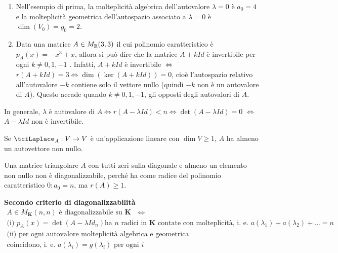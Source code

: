 \documentclass{article}
\begin{document}
\begin{enumerate}
\item Nell'esempio di prima, la molteplicit\`{a} algebrica dell'autovalore $%
\lambda =0$ \`{e} $a_{0}=4$ e la molteplicit\`{a} geometrica dell'autospazio
associato a $\lambda =0$ \`{e} $\dim \left( V_{0}\right) =g_{0}=2$.

\item Data una matrice $A\in M_{%
\mathbb{R}
}(3,3)$ il cui polinomio caratteristico \`{e} $p_{A}(x)=-x^{3}+x$, allora si
pu\`{o} dire che la matrice $A+kId$ \`{e} invertibile per ogni $k\neq 0,1,-1$%
. Infatti, $A+kId$ \`{e} invertibile $\Longleftrightarrow $ $r\left(
A+kId\right) =3\Longleftrightarrow \dim \left( \ker \left( A+kId\right)
\right) =0$, cio\`{e} l'autospazio relativo all'autovalore $-k$ contiene
solo il vettore nullo (quindi $-k$ non \`{e} un autovalore di $A$). Questo
accade quando $k\neq 0,1,-1$, gli opposti degli autovalori di $A$.
\end{enumerate}

In generale, $\lambda $ \`{e} autovalore di $A\Longleftrightarrow r\left(
A-\lambda Id\right) <n\Longleftrightarrow \det \left( A-\lambda Id\right) =0$
$\Longleftrightarrow $ $A-\lambda Id$ non \`{e} invertibile.

Se $\tciLaplace _{A}:V\rightarrow V$ \`{e} un'applicazione lineare con $\dim
V\geq 1$, $A$ ha almeno un autovettore non nullo.

Una matrice triangolare $A$ con tutti zeri sulla diagonale e almeno un
elemento non nullo non \`{e} diagonalizzabile, perch\'{e} ha come radice del
polinomio caratteristico $0:a_{0}=n$, ma $r\left( A\right) \geq 1$.

\textbf{Secondo criterio di diagonalizzabilit\`{a}}%
\begin{gather*}
A\in M_{\mathbf{K}}\left( n,n\right) \text{ \`{e} diagonalizzabile su }%
\mathbf{K}\text{ }\Longleftrightarrow \\
\text{(i) }p_{A}\left( x\right) =\det \left( A-\lambda Id_{n}\right) \text{
ha }n\text{ radici in }\mathbf{K}\text{ contate con molteplicit\`{a}, i. e. }%
a\left( \lambda _{1}\right) +a\left( \lambda _{2}\right) +...=n \\
\text{(ii) per ogni autovalore molteplicit\`{a} algebrica e geometrica } \\
\text{coincidono, i. e. }a\left( \lambda _{i}\right) =g\left( \lambda
_{i}\right) \text{ per ogni }i
\end{gather*}
\end{document}
